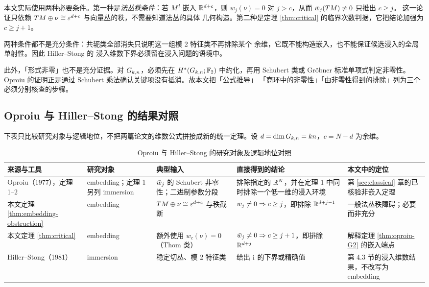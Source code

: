 本文实际使用两种必要条件。第一种是\emph{法丛秩条件}：若 $M^{d}$ 嵌入
$\mathbb{R}^{d+c}$，则 $w_j(\nu)=0$ 对 $j>c$，从而 $\bar w_j(TM)\neq0$ 只推出 $c\ge j$。
这一论证只依赖 $TM\oplus\nu\cong\varepsilon^{d+c}$ 与向量丛的秩，不需要知道法丛的具体
几何构造。第二种是定理 \ref{thm:critical} 的临界次数判据，它把结论加强为
$c\ge j+1$。

两种条件都不是充分条件：共轭类全部消失只说明这一组模 $2$ 特征类不再排除某个
余维，它既不能构造嵌入，也不能保证候选浸入的全局单射性。因此 Hiller--Stong 的
浸入维数下界必须留在浸入问题的语境中。

此外，「形式非零」也不是充分证据。对 $G_{k,n}$，必须先在
$H^{*}(G_{k,n};\mathbb{F}_2)$ 中约化，再用 Schubert 类或 Gr\"obner 标准单项式判定非零性。
Oproiu 的证明正是通过 Schubert 乘法确认关键项没有抵消。故本文把「公式推导」
「商环中的非零性」「由非零性得到的排除」列为三个必须分别核查的步骤。

\subsection{Oproiu 与 Hiller--Stong 的结果对照}

下表只比较研究对象与逻辑地位，不把两篇论文的维数公式拼接成新的统一定理。设
$d=\dim G_{k,n}=kn$，$c=N-d$ 为余维。

\begin{table}[!htbp]
\centering
\footnotesize
\renewcommand{\arraystretch}{1.18}
\caption{Oproiu 与 Hiller--Stong 的研究对象及逻辑地位对照}
\label{tab:comparison}
\begin{tabularx}{\textwidth}{@{}>{\raggedright\arraybackslash}p{2.45cm}
    >{\raggedright\arraybackslash}p{2.95cm}
    >{\raggedright\arraybackslash}X
    >{\raggedright\arraybackslash}X
    >{\raggedright\arraybackslash}p{2.45cm}@{}}
\toprule
来源与工具 & 研究对象 & 典型输入 & 直接得到的结论 & 本文中的定位 \\
\midrule
Oproiu（1977），定理 1--2 & embedding；定理 1 另列 immersion &
$\bar w_j$ 的 Schubert 非零性；二进制参数分段 &
排除指定的 $\mathbb{R}^{N}$，并在定理 1 中同时排除一个低一维的浸入环境 &
第 \ref{sec:classical} 章的已核验非嵌入定理 \\
\addlinespace[2pt]
本文定理 \ref{thm:embedding-obstruction} & embedding &
$TM\oplus\nu\cong\varepsilon^{d+c}$ 与秩截断 &
$\bar w_j\neq0\Rightarrow c\ge j$，即排除 $\mathbb{R}^{d+j-1}$ &
一般法丛秩障碍；必要而非充分 \\
\addlinespace[2pt]
本文定理 \ref{thm:critical} & embedding &
额外使用 $w_c(\nu)=0$（Thom 类） &
$\bar w_j\neq0\Rightarrow c\ge j+1$，即排除 $\mathbb{R}^{d+j}$ &
解释定理 \ref{thm:oproiu-G2} 的嵌入端点 \\
\addlinespace[2pt]
Hiller--Stong（1981） & immersion &
稳定切丛、模 $2$ 特征类 & 给出 $\operatorname{i}$ 的下界或精确值 &
第 4.3 节的浸入维数结果，不改写为 embedding \\
\bottomrule
\end{tabularx}
\end{table}

